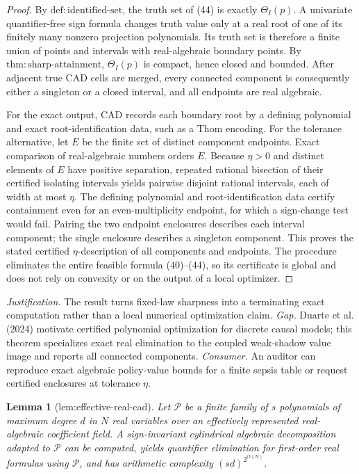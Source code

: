 \documentclass{article}
\newtheorem{lemma}{Lemma}
\begin{document}
\begin{proof}
By \(\mathrm{def{:}identified\text{-}set}\), the truth set of (44) is exactly \(\Theta_I(p)\).  A univariate quantifier-free sign formula changes truth value only at a real root of one of its finitely many nonzero projection polynomials.  Its truth set is therefore a finite union of points and intervals with real-algebraic boundary points.  By \(\mathrm{thm{:}sharp\text{-}attainment}\), \(\Theta_I(p)\) is compact, hence closed and bounded.  After adjacent true CAD cells are merged, every connected component is consequently either a singleton or a closed interval, and all endpoints are real algebraic.

For the exact output, CAD records each boundary root by a defining polynomial and exact root-identification data, such as a Thom encoding.  For the tolerance alternative, let \(E\) be the finite set of distinct component endpoints.  Exact comparison of real-algebraic numbers orders \(E\).  Because \(\eta>0\) and distinct elements of \(E\) have positive separation, repeated rational bisection of their certified isolating intervals yields pairwise disjoint rational intervals, each of width at most \(\eta\).  The defining polynomial and root-identification data certify containment even for an even-multiplicity endpoint, for which a sign-change test would fail.  Pairing the two endpoint enclosures describes each interval component; the single enclosure describes a singleton component.  This proves the stated certified \(\eta\)-description of all components and endpoints.  The procedure eliminates the entire feasible formula (40)--(44), so its certificate is global and does not rely on convexity or on the output of a local optimizer.
\end{proof}
\par\smallskip\noindent \textit{Justification.} The result turns fixed-law sharpness into a terminating exact computation rather than a local numerical optimization claim. \textit{Gap.} Duarte et al. (2024) motivate certified polynomial optimization for discrete causal models; this theorem specializes exact real elimination to the coupled weak-shadow value image and reports all connected components. \textit{Consumer.} An auditor can reproduce exact algebraic policy-value bounds for a finite sepsis table or request certified enclosures at tolerance \(\eta\).

\begin{lemma}[lem:effective-real-cad]\label{lem:effective-real-cad}
Let \(\mathcal P\) be a finite family of \(s\) polynomials of maximum degree \(d\) in \(N\) real variables over an effectively represented real-algebraic coefficient field. A sign-invariant cylindrical algebraic decomposition adapted to \(\mathcal P\) can be computed, yields quantifier elimination for first-order real formulas using \(\mathcal P\), and has arithmetic complexity \((sd)^{2^{O(N)}}\).
\end{lemma}
\end{document}

